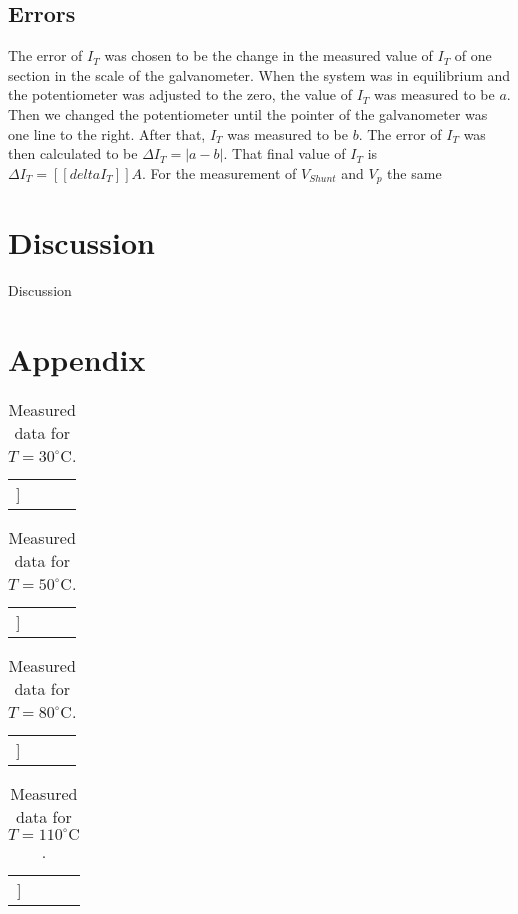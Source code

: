 \documentclass[a4paper]{article}
\begin{document}
\subsection{Errors}

The error of $I_T$ was chosen to be the change in the measured value of $I_T$ of one section in the scale of the galvanometer. When the system was in equilibrium and the potentiometer was adjusted to the zero, the value of $I_T$ was measured to be $a$. Then we changed the potentiometer until the pointer of the galvanometer was one line to the right. After that, $I_T$ was measured to be $b$. The error of $I_T$ was then calculated to be $\Delta I_T = |a-b|$. That final value of $I_T$ is $\Delta I_T = [[deltaI_T]] A$.
\newline
For the measurement of $V_{Shunt}$ and $V_p$ the same

\section{Discussion}
Discussion

\section{Appendix}

\begin{table}[H]
\centering
\begin{tabular}{r|rrr}
\hline
[[table30]]
\end{tabular}
\caption{Measured data for $T=30^\circ\text{C}$.}
\end{table}

\begin{table}[H]
\centering
\begin{tabular}{r|rrr}
\hline
[[table50]]
\end{tabular}
\caption{Measured data for $T=50^\circ\text{C}$.}
\end{table}

\begin{table}[H]
\centering
\begin{tabular}{r|rrr}
\hline
[[table80]]
\end{tabular}
\caption{Measured data for $T=80^\circ\text{C}$.}
\end{table}

\begin{table}[H]
\centering
\begin{tabular}{r|rrr}
\hline
[[table110]]
\end{tabular}
\caption{Measured data for $T=110^\circ\text{C}$.}
\end{table}
\end{document}
